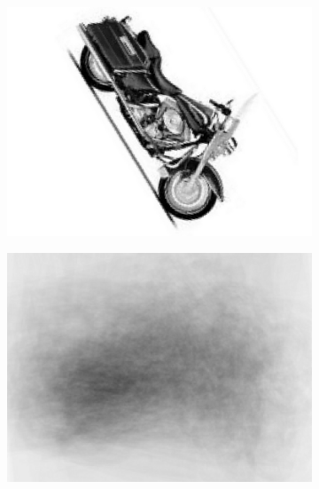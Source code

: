 \begin{figure}[ht]
\centering
\begin{subfigure}[b]{0.28\linewidth} \centering 
	\includegraphics[width=\linewidth]{fig/reg/onebike_before2.png}
	\label{fig/reg/concept1}
\end{subfigure}
\begin{subfigure}[b]{0.28\linewidth} \centering 
	\includegraphics[width=\linewidth]{fig/reg/avgbike_before.png}
	\label{fig/reg/concept2}
\end{subfigure} \\ 
\begin{subfigure}[b]{0.28\linewidth} \centering

\end{subfigure}
\end{figure}
